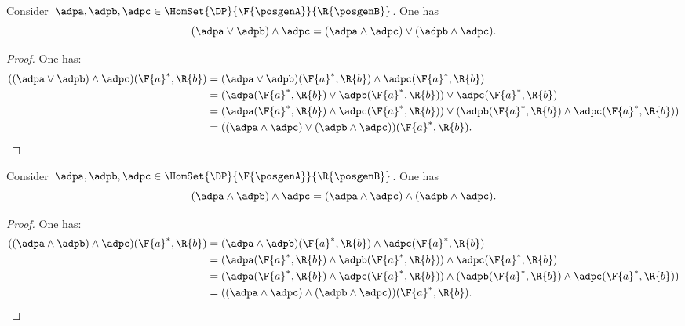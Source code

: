 {\begin{lemma}
    \label{lem:wedge_vee}
    Consider~$\adpa,\adpb,\adpc\in \HomSet{\DP}{\F{\posgenA}}{\R{\posgenB}}$. One has
    \begin{equation*}
        (\adpa \vee \adpb)\wedge \adpc=(\adpa \wedge \adpc) \vee (\adpb\wedge \adpc).
    \end{equation*}
\end{lemma}
\begin{proof}
    One has:
    \begin{equation*}
        \begin{aligned}
            ((\adpa \vee \adpb)\wedge \adpc)(\F{a}^*,\R{b})&=
            (\adpa \vee \adpb)(\F{a}^*,\R{b})\wedge \adpc(\F{a}^*,\R{b})\\
            &=(\adpa(\F{a}^*,\R{b}) \vee \adpb(\F{a}^*,\R{b}))\vee \adpc(\F{a}^*,\R{b})\\
            &=(\adpa(\F{a}^*,\R{b}) \wedge  \adpc(\F{a}^*,\R{b})) \vee (\adpb(\F{a}^*,\R{b})\wedge \adpc(\F{a}^*,\R{b}))\\
            &=((\adpa \wedge \adpc) \vee (\adpb\wedge \adpc))(\F{a}^*,\R{b}).
        \end{aligned}
    \end{equation*}
\end{proof}

\begin{lemma}
    \label{lem:wedge_wedge}
    Consider~$\adpa,\adpb,\adpc\in \HomSet{\DP}{\F{\posgenA}}{\R{\posgenB}}$. One has
    \begin{equation*}
        (\adpa \wedge \adpb)\wedge \adpc=(\adpa \wedge \adpc) \wedge (\adpb\wedge \adpc).
    \end{equation*}
\end{lemma}
\begin{proof}
    One has:
    \begin{equation*}
        \begin{aligned}
            ((\adpa \wedge \adpb)\wedge \adpc)(\F{a}^*,\R{b})&=
            (\adpa \wedge \adpb)(\F{a}^*,\R{b})\wedge \adpc(\F{a}^*,\R{b})\\
            &=(\adpa(\F{a}^*,\R{b}) \wedge \adpb(\F{a}^*,\R{b}))\wedge \adpc(\F{a}^*,\R{b})\\
            &=(\adpa(\F{a}^*,\R{b}) \wedge  \adpc(\F{a}^*,\R{b})) \wedge (\adpb(\F{a}^*,\R{b})\wedge \adpc(\F{a}^*,\R{b}))\\
            &=((\adpa \wedge \adpc) \wedge (\adpb\wedge \adpc))(\F{a}^*,\R{b}).
        \end{aligned}
    \end{equation*}
\end{proof}

}
